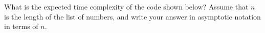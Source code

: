 \begin{prob}
    What is the expected time complexity of the code shown below?
    Assume that $n$ is the length of the list of numbers, and write your
    answer in asymptotic notation in terms of $n$.

    \inputminted{python}{code.py}


\end{prob}

